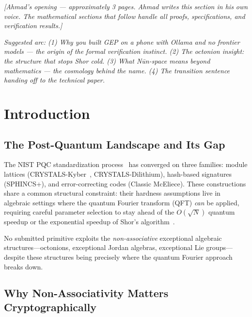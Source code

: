 \documentclass[11pt,letterpaper]{article}
\theoremstyle{definition}
\begin{document}
\begin{ahmadvoice}
\textit{[Ahmad's opening — approximately 3 pages. Ahmad writes this section
in his own voice. The mathematical sections that follow handle all proofs,
specifications, and verification results.]}

\medskip
\textit{Suggested arc: (1) Why you built GEP on a phone with Ollama and no
frontier models — the origin of the formal verification instinct.
(2) The octonion insight: the structure that stops Shor cold.
(3) What N\={u}n-space means beyond mathematics — the cosmology behind the name.
(4) The transition sentence handing off to the technical paper.}
\end{ahmadvoice}

\newpage

\section{Introduction}
\label{sec:introduction}

\subsection{The Post-Quantum Landscape and Its Gap}

The NIST PQC standardization process~\cite{nist2024} has converged on three
families: module lattices (CRYSTALS-Kyber~\cite{kyber}, CRYSTALS-Dilithium),
hash-based signatures (SPHINCS+), and error-correcting codes (Classic McEliece).
These constructions share a common structural constraint: their hardness
assumptions live in algebraic settings where the quantum Fourier transform (QFT)
\emph{can} be applied, requiring careful parameter selection to stay ahead of
the $O(\sqrt{N})$ quantum speedup or the exponential speedup of Shor's
algorithm~\cite{shor1994}.

No submitted primitive exploits the \emph{non-associative} exceptional
algebraic structures---octonions, exceptional Jordan algebras, exceptional Lie
groups---despite these structures being precisely where the quantum Fourier
approach breaks down.

\subsection{Why Non-Associativity Matters Cryptographically}
\end{document}
